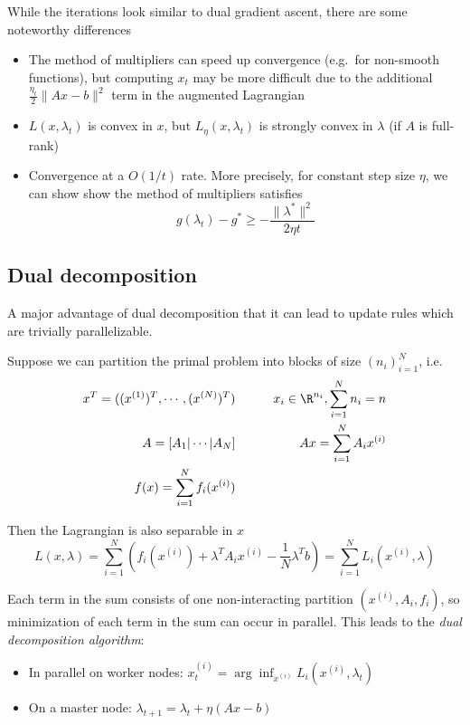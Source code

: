 While the iterations look similar to dual gradient ascent, there are
some noteworthy differences
\begin{itemize}
\item The method of multipliers can speed up
convergence (e.g.~for non-smooth functions), but computing $x_t$ may
be more difficult due to the additional
$\frac{\eta_t}{2} \|A x - b\|^2$ term in the augmented Lagrangian
\item $L(x, \lambda_t)$ is convex in $x$, but $L_\eta(x, \lambda_t)$ is
strongly convex in $\lambda$ (if $A$ is full-rank)
\item Convergence at
a $O(1/t)$ rate. More precisely, for constant step size $\eta$, we
can show show the method of multipliers satisfies
\[g(\lambda_t) - g^* \geq -\frac{\|\lambda^*\|^2}{2\eta t}\]
\end{itemize}

\subsection{Dual decomposition}

A major advantage of dual decomposition that it can lead to update rules
which are trivially parallelizable.

Suppose we can partition the primal problem into blocks of size
$(n_i)_{i=1}^N$, i.e.
\begin{align}
x ^T = ((x^{(1)})^T, \cdots, (x^{(N)})^T) &\qquad& x_i \in \R^{n_i}, \sum_{i=1}^N n_i = n \\
A = [A_1 \vert \cdots \vert A_N] &\qquad& A x = \sum_{i=1}^N A_i x^{(i)} \\
f(x) = \sum_{i=1}^N f_i(x^{(i)})
\end{align}

Then the Lagrangian is also separable in $x$
\[
L(x, \lambda) = \sum_{i=1}^N \left( f_i(x^{(i)}) + \lambda^T A_i x^{(i)} - \frac{1}{N} \lambda^T b\right) = \sum_{i=1}^N L_i(x^{(i)}, \lambda)
\]

Each term in the sum consists of one non-interacting partition
$(x^{(i)}, A_i, f_i)$, so minimization of each term in the sum can
occur in parallel. This leads to the \emph{dual decomposition
algorithm}:

\begin{itemize}
\item
  In parallel on worker nodes:
  $x_t^{(i)} = \arg\inf_{x^{(i)}} L_i(x^{(i)}, \lambda_t)$
\item
  On a master node: $\lambda_{t+1} = \lambda_t + \eta (A x - b)$
\end{itemize}

